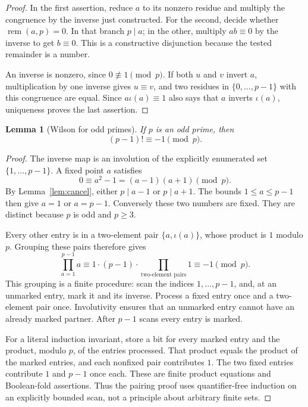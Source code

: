\documentclass[11pt,letterpaper]{article}
\newtheorem{lemma}[theorem]{Lemma}
\theoremstyle{definition}
\theoremstyle{remark}
\newcommand{\remd}{\operatorname{rem}}
\begin{document}
\begin{proof}
In the first assertion, reduce \(a\) to its nonzero residue and multiply
the congruence by the inverse just constructed. For the second, decide
whether \(\remd(a,p)=0\). In that branch \(p\mid a\); in the other,
multiply \(ab\equiv0\) by the inverse to get \(b\equiv0\).
This is a constructive disjunction because the tested remainder is a number.

An inverse is nonzero, since \(0\not\equiv1\pmod p\).
If both \(u\) and \(v\) invert \(a\), multiplication by one inverse gives
\(u\equiv v\), and two residues in \(\{0,\ldots,p-1\}\) with this congruence
are equal. Since \(a\iota(a)\equiv1\) also says that \(a\) inverts
\(\iota(a)\), uniqueness proves the last assertion.
\end{proof}

\begin{lemma}[Wilson for odd primes]
\label{lem:wilson}
If \(p\) is an odd prime, then
\[
 (p-1)!\equiv-1\pmod p.
\]
\end{lemma}

\begin{proof}
The inverse map is an involution of the explicitly enumerated set
\(\{1,\ldots,p-1\}\). A fixed point \(a\) satisfies
\[
 0\equiv a^2-1=(a-1)(a+1)\pmod p.
\]
By Lemma~\ref{lem:cancel}, either \(p\mid a-1\) or \(p\mid a+1\).
The bounds \(1\le a\le p-1\) then give \(a=1\) or \(a=p-1\).
Conversely these two numbers are fixed. They are distinct because \(p\)
is odd and \(p\ge3\).

Every other entry is in a two-element pair \(\{a,\iota(a)\}\), whose
product is \(1\) modulo \(p\). Grouping these pairs therefore gives
\[
 \prod_{a=1}^{p-1}a
 \equiv 1\cdot(p-1)\cdot\prod_{\text{two-element pairs}}1
 \equiv-1\pmod p.
\]
This grouping is a finite procedure: scan the indices \(1,\ldots,p-1\),
and, at an unmarked entry, mark it and its inverse. Process a fixed entry
once and a two-element pair once. Involutivity ensures that an unmarked
entry cannot have an already marked partner. After \(p-1\) scans every
entry is marked.

For a literal induction invariant, store a bit for every marked entry and
the product, modulo \(p\), of the entries processed. That product equals
the product of the marked entries, and each nonfixed pair contributes
\(1\). The two fixed entries contribute \(1\) and \(p-1\) once each.
These are finite product equations and Boolean-fold assertions. Thus the
pairing proof uses quantifier-free induction on an explicitly bounded scan,
not a principle about arbitrary finite sets.
\end{proof}
\end{document}
